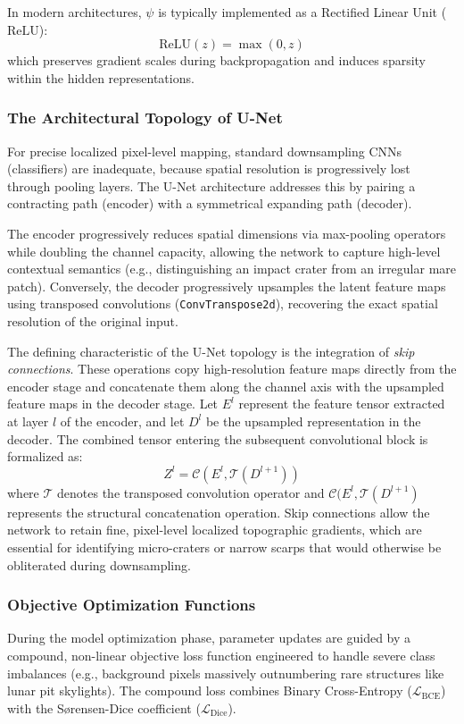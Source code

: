 \documentclass{aa}
\begin{document}
In modern architectures, $\psi$ is typically implemented as a Rectified Linear Unit ($\text{ReLU}$):
\begin{equation*}
\text{ReLU}(z) = \max(0, z)
\end{equation*}
which preserves gradient scales during backpropagation and induces sparsity within the hidden representations.

\subsubsection{The Architectural Topology of U-Net}

For precise localized pixel-level mapping, standard
downsampling CNNs (classifiers) are inadequate,
because spatial resolution is progressively lost
through pooling layers. The U-Net architecture
addresses this by pairing a contracting path
(encoder) with a symmetrical expanding path
(decoder).

The encoder progressively reduces spatial
dimensions via max-pooling operators while doubling
the channel capacity, allowing the network to
capture high-level contextual semantics (e.g.,
distinguishing an impact crater from an irregular
mare patch). Conversely, the decoder progressively
upsamples the latent feature maps using transposed
convolutions (\texttt{ConvTranspose2d}), recovering
the exact spatial resolution of the original input.

The defining characteristic of the U-Net topology is the integration of \textit{skip connections}. These operations copy high-resolution feature maps directly from the encoder stage and concatenate them along the channel axis with the upsampled feature maps in the decoder stage. Let $E^l$ represent the feature tensor extracted at layer $l$ of the encoder, and let $D^l$ be the upsampled representation in the decoder. The combined tensor entering the subsequent convolutional block is formalized as:
\begin{equation*}
Z^l = \mathcal{C}\left( E^l, \mathcal{T}(D^{l+1}) \right)
\end{equation*}
where $\mathcal{T}$ denotes the transposed convolution operator and $\mathcal{C}(E^l, \mathcal{T}(D^{l+1})$ represents the structural concatenation operation. Skip connections allow the network to retain fine, pixel-level localized topographic gradients, which are essential for identifying micro-craters or narrow scarps that would otherwise be obliterated during downsampling.

\subsubsection{Objective Optimization Functions}
During the model optimization phase, parameter updates are guided by a compound, non-linear objective loss function engineered to handle severe class imbalances (e.g., background pixels massively outnumbering rare structures like lunar pit skylights). The compound loss combines Binary Cross-Entropy ($\mathcal{L}_{\text{BCE}}$) with the S{\o}rensen-Dice coefficient ($\mathcal{L}_{\text{Dice}}$).
\end{document}
